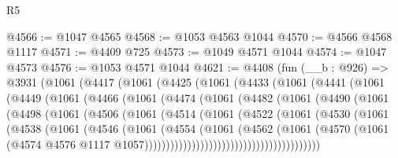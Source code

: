 \begin{lexlean}{R5}
\begin{coremodule}
@4566 := @1047 @4565
@4568 := @1053 @4563 @1044
@4570 := @4566 @4568 @1117
@4571 := @4409 @725
@4573 := @1049 @4571 @1044
@4574 := @1047 @4573
@4576 := @1053 @4571 @1044
@4621 := @4408
    (fun (__b : @926) =>
    @3931
      (@1061
        (@4417
          (@1061
            (@4425
              (@1061
                (@4433
                  (@1061
                    (@4441
                      (@1061
                        (@4449
                          (@1061
                            (@4466
                              (@1061
                                (@4474
                                  (@1061
                                    (@4482
                                      (@1061
                                        (@4490
                                          (@1061
                                            (@4498
                                              (@1061
                                                (@4506
                                                  (@1061
                                                    (@4514
                                                      (@1061
                                                        (@4522
                                                          (@1061
                                                            (@4530
                                                              (@1061
                                                                (@4538
                                                                  (@1061
                                                                    (@4546
                                                                      (@1061
                                                                        (@4554
                                                                          (@1061
                                                                            (@4562
                                                                              (@1061
                                                                                (@4570
                                                                                  (@1061
                                                                                    (@4574
                                                                                      @4576
                                                                                      @1117
                                                                                      @1057)))))))))))))))))))))))))))))))))))))))))

\end{coremodule}
\end{lexlean}
